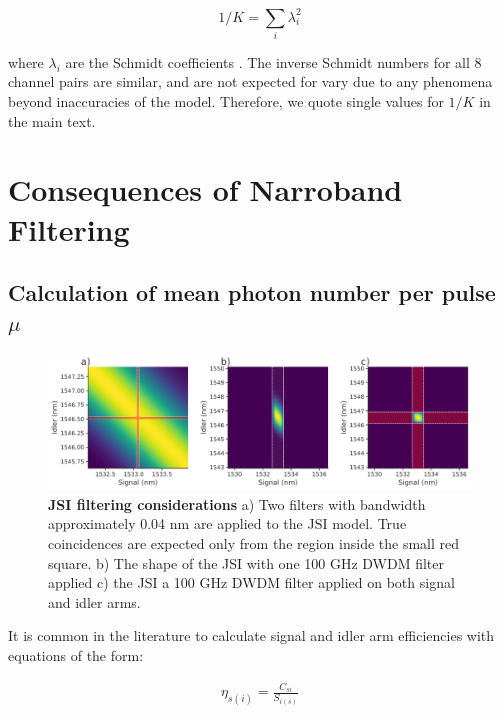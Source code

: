 \documentclass[11pt]{caltech_thesis} %
\begin{document}
$$1/K = \sum_i \lambda_i^2$$

where $\lambda_i$ are the Schmidt coefficients \autocite{ZielnickiKwiat2018SPDCmodel}. The inverse Schmidt numbers for all 8 channel pairs are similar, and are not expected for vary due to any phenomena beyond inaccuracies of the model. Therefore, we quote single values for $1/K$ in the main text.

\hypertarget{consequences-of-narroband-filtering}{%
\section{Consequences of Narroband Filtering}\label{consequences-of-narroband-filtering}}

\hypertarget{calculation-of-mean-photon-number-per-pulse-ux3bc}{%
\subsection{\texorpdfstring{Calculation of mean photon number per pulse \texorpdfstring{$\mu$}{mu}}{Calculation of mean photon number per pulse }}\label{calculation-of-mean-photon-number-per-pulse-ux3bc}}

\hypertarget{fig:narroband}{%
\begin{figure}
\centering
\includegraphics[width=1\textwidth,height=\textheight]{./chapter_05/figs/filter_considerations_light.pdf}
\caption[{JSI filtering considerations}]{\textbf{JSI filtering considerations} a) Two filters with bandwidth approximately 0.04 nm are applied to the JSI model. True coincidences are expected only from the region inside the small red square. b) The shape of the JSI with one 100 GHz DWDM filter applied c) the JSI a 100 GHz DWDM filter applied on both signal and idler arms.}
\label{fig:narroband}
\end{figure}
}

It is common in the literature to calculate signal and idler arm efficiencies with equations of the form:

\hypertarget{eq:regular_eff}{}{
\begin{align}
\eta_{s(i)}=\frac{C_{s i}}{S_{i(s)}} \label{eq:regular_eff}
\end{align}
}
\end{document}
